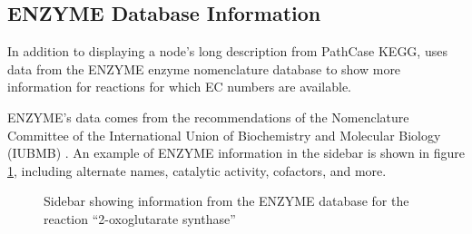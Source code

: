 \subsection{ENZYME Database Information}

In addition to displaying a node's long description from PathCase KEGG, \keggapp
uses data from the ENZYME enzyme nomenclature database \cite{enzyme-database} to
show more information for reactions for which EC numbers are available.

ENZYME's data comes from the recommendations of the Nomenclature Committee of
the International Union of Biochemistry and Molecular Biology (IUBMB)
\cite{enzyme-database}. An example of ENZYME information in the sidebar is shown
in figure \ref{fig:kegg_screenshot_selection_info}, including alternate names,
catalytic activity, cofactors, and more.

\begin{figure}[hbt]
    \caption{\label{fig:kegg_screenshot_selection_info} Sidebar showing
    information from the ENZYME database for the reaction ``2-oxoglutarate
    synthase''}
\end{figure}
